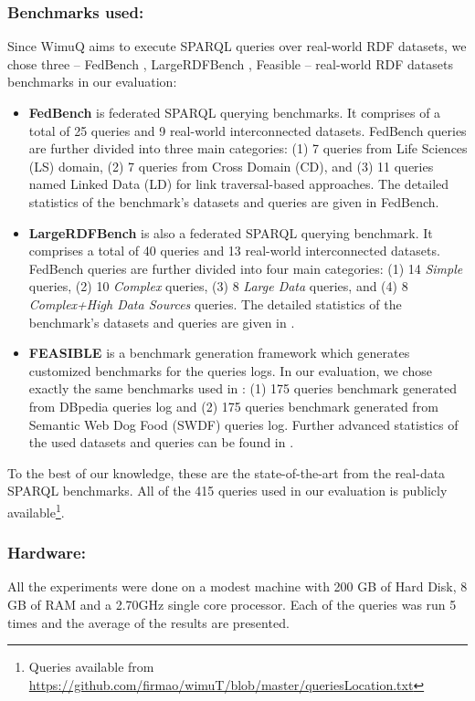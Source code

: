 \subsubsection{Benchmarks used:} Since WimuQ aims to execute SPARQL queries over real-world RDF datasets, we chose three -- FedBench \cite{fedbench2011}, LargeRDFBench \cite{largerdfbench2017}, Feasible \cite{feasible2015} -- real-world RDF datasets benchmarks in our evaluation: 
\begin{itemize}
  
\item \textbf{FedBench} is federated SPARQL querying benchmarks. It comprises of a total of 25 queries and 9 real-world interconnected datasets. FedBench queries are further divided into three main categories: (1) 7 queries from Life Sciences (LS) domain, (2) 7 queries from Cross Domain (CD), and (3) 11 queries named Linked Data (LD) for link traversal-based approaches. The detailed statistics of the benchmark's datasets and queries are given in FedBench\cite{fedbench2011}.

\item  \textbf{LargeRDFBench} is also a federated SPARQL querying benchmark. It comprises a total of 40 queries and 13 real-world interconnected datasets. FedBench queries are further divided into four main categories: (1) 14 \emph{Simple} queries, (2) 10 \emph{Complex} queries, (3)  8 \emph{Large Data} queries, and (4) 8 \emph{Complex+High Data Sources} queries. The detailed statistics of the benchmark's datasets and queries are given in \cite{largerdfbench2017}. 

\item  \textbf{FEASIBLE} is a benchmark generation framework which generates customized benchmarks for the queries logs. In our evaluation, we chose exactly the same benchmarks used in \cite{feasible2015}: (1) 175 queries benchmark generated from DBpedia queries log and (2) 175 queries benchmark generated from Semantic Web Dog Food (SWDF) queries log. Further advanced statistics of the used datasets and queries can be found in \cite{feasible2015}. 
\end{itemize}
To the best of our knowledge, these are the state-of-the-art from the real-data SPARQL benchmarks. All of the 415 queries used in our evaluation is publicly available\footnote{Queries available from \url{https://github.com/firmao/wimuT/blob/master/queriesLocation.txt}}. 

\subsubsection{Hardware:} All the experiments were done on a modest machine with 200 GB of Hard Disk, 8 GB of RAM and a 2.70GHz single core processor. Each of the queries was run 5 times and the average of the results are presented.  

